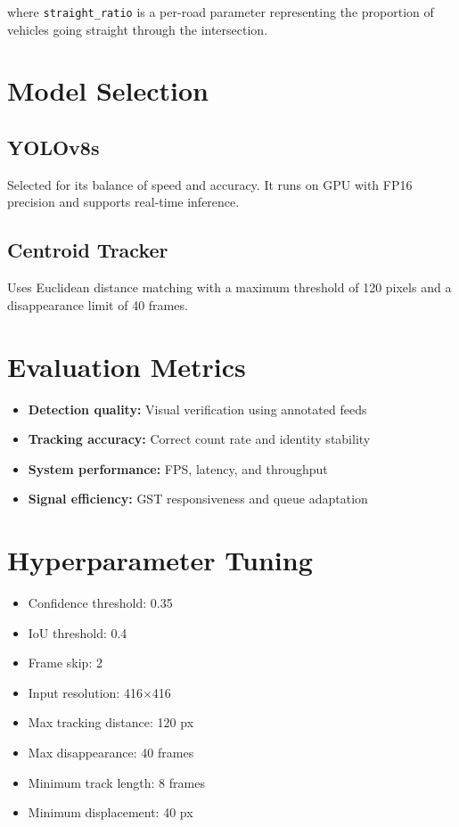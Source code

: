 where \texttt{straight\_ratio} is a per-road parameter representing the proportion of vehicles going straight through the intersection.

\section{Model Selection}

\subsection{YOLOv8s}
Selected for its balance of speed and accuracy. It runs on GPU with FP16 precision and supports real-time inference.

\subsection{Centroid Tracker}
Uses Euclidean distance matching with a maximum threshold of 120 pixels and a disappearance limit of 40 frames.

\section{Evaluation Metrics}

\begin{itemize}
    \item \textbf{Detection quality:} Visual verification using annotated feeds
    \item \textbf{Tracking accuracy:} Correct count rate and identity stability
    \item \textbf{System performance:} FPS, latency, and throughput
    \item \textbf{Signal efficiency:} GST responsiveness and queue adaptation
\end{itemize}

\section{Hyperparameter Tuning}

\begin{itemize}
    \item Confidence threshold: 0.35
    \item IoU threshold: 0.4
    \item Frame skip: 2
    \item Input resolution: 416$\times$416
    \item Max tracking distance: 120 px
    \item Max disappearance: 40 frames
    \item Minimum track length: 8 frames
    \item Minimum displacement: 40 px
\end{itemize}

